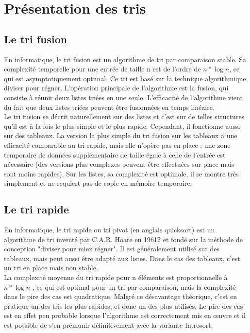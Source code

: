 \documentclass[11pt,a4paper]{article}
\begin{document}
\section{Présentation des tris}
\subsection{Le tri fusion}
En informatique, le tri fusion est un algorithme de tri par comparaison stable. Sa complexité temporelle pour une entrée de taille n est de l'ordre de
$\displaystyle{n * \log n}$, ce qui est asymptotiquement optimal. Ce tri est basé sur la technique algorithmique diviser pour régner. L'opération principale de
l'algorithme est la fusion, qui consiste à réunir deux listes triées en une seule. L'efficacité de l'algorithme vient du fait que deux listes triées peuvent être
fusionnées en temps linéaire.\\
Le tri fusion se décrit naturellement sur des listes et c'est sur de telles structures qu'il est à la fois le plus simple et le plus rapide. Cependant, il fonctionne
aussi sur des tableaux. La version la plus simple du tri fusion sur les tableaux a une efficacité comparable au tri rapide, mais elle n'opère pas en place : une zone
temporaire de données supplémentaire de taille égale à celle de l'entrée est nécessaire (des versions plus complexes peuvent être effectuées sur place
mais sont moins rapides). Sur les listes, sa complexité est optimale, il se montre très simplement et ne requiert pas de copie en mémoire temporaire.

\subsection{Le tri rapide}
En informatique, le tri rapide ou tri pivot (en anglais quicksort) est un algorithme de tri inventé par C.A.R. Hoare en 19612 et fondé sur la méthode de conception
"diviser pour miex régner". Il est généralement utilisé sur des tableaux, mais peut aussi être adapté aux listes. Dans le cas des tableaux, c'est un tri en place
mais non stable.\\
La complexité moyenne du tri rapide pour n éléments est proportionnelle à $\displaystyle{n * \log n}$ , ce qui est optimal pour un tri par comparaison,
mais la complexité dans le pire des cas est quadratique. Malgré ce désavantage théorique, c'est en pratique un des tris les plus rapides, et donc un des plus utilisés.
Le pire des cas est en effet peu probable lorsque l'algorithme est correctement mis en œuvre et il est possible de s'en prémunir définitivement avec la variante Introsort.
\end{document}
